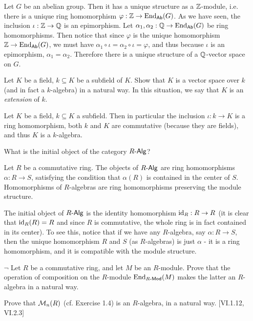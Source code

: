 \begin{solution}
	Let $G$ be an abelian group. Then it has a unique structure as a $\mathbb{Z}$-module, i.e. there is a unique ring homomorphism $\varphi: \mathbb{Z} \to \mathrm{End}_{\mathsf{Ab}}(G)$. As we have seen, the inclusion $\iota: \mathbb{Z} \to \mathbb{Q}$ is an epimorphism. Let $\alpha_1, \alpha_2: \mathbb{Q} \to \mathrm{End}_{\mathsf{Ab}}(G)$ be ring homomorphisms. Then notice that since $\varphi$ is the unique homomorphism $\mathbb{Z} \to \mathrm{End}_{\mathsf{Ab}}(G)$, we must have $\alpha_1 \circ \iota = \alpha_2 \circ \iota = \varphi$, and thus because $\iota$ is an epimorphism, $\alpha_1 = \alpha_2$. Therefore there is a unique structure of a $\mathbb{Q}$-vector space on $G$.
\end{solution}

\begin{problem}
	Let $K$ be a field, $k \subseteq K$ be a subfield of $K$. Show that $K$ is a vector space over $k$ (and in fact a $k$-algebra) in a natural way. In this situation, we say that $K$ is an \emph{extension} of $k$.
\end{problem}

\begin{solution}
	Let $K$ be a field, $k \subseteq K$ a subfield. Then in particular the inclusion $\iota: k \to K$ is a ring homomorphism, both $k$ and $K$ are commutative (because they are fields), and thus $K$ is a $k$-algebra.
\end{solution}

\begin{problem}
	What is the initial object of the category $R\text{-}\mathsf{Alg}$?
\end{problem}

\begin{solution}
	Let $R$ be a commutative ring. The objects of $R\text{-}\mathsf{Alg}$ are ring homomorphisms $\alpha: R \to S$, satisfying the condition that $\alpha(R)$ is contained in the center of $S$. Homomorphisms of $R$-algebras are ring homomorphisms preserving the module structure.
	
	The initial object of $R\text{-}\mathsf{Alg}$ is the identity homomorphism $\mathrm{id}_R: R \to R$ (it is clear that $\mathrm{id}_R(R) = R$ and since $R$ is commutative, the whole ring is in fact contained in its center). To see this, notice that if we have any $R$-algebra, say $\alpha: R \to S$, then the unique homomorphism $R$ and $S$ (as $R$-algebras) is just $\alpha$ - it is a ring homomorphism, and it is compatible with the module structure.
\end{solution}

\begin{problem}
	$\neg$ Let $R$ be a commutative ring, and let $M$ be an $R$-module. Prove that the operation of composition on the $R$-module $\mathrm{End}_{R\text{-}\mathsf{Mod}}(M)$ makes the latter an $R$-algebra in a natural way.
	
	Prove that $\mathcal{M}_n(R)$ (cf. Exercise 1.4) is an $R$-algebra, in a natural way. [VI.1.12, VI.2.3]
\end{problem}

